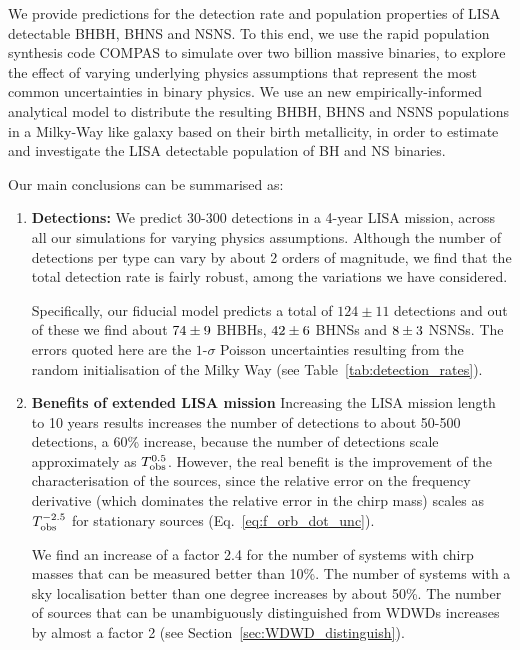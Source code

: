 We provide predictions for the detection rate and population properties of LISA detectable BHBH, BHNS and NSNS.
To this end, we use the rapid population synthesis code COMPAS to simulate over two billion massive binaries, to explore the effect of varying underlying physics assumptions that represent the most common uncertainties in binary physics. We use an new empirically-informed analytical model to distribute the resulting BHBH, BHNS and NSNS populations in a Milky-Way like galaxy based on their birth metallicity, in order to estimate and investigate the LISA detectable population of BH and NS binaries.

Our main conclusions can be summarised as:
\begin{enumerate}
    \item \textbf{Detections:} We predict 30-300 detections in a 4-year LISA mission, across all our simulations for varying physics assumptions. Although the number of detections per type can vary by about 2 orders of magnitude, we find that the total detection rate is fairly robust, among the variations we have considered.
    
    Specifically, our fiducial model predicts a total of $124 \pm 11$ detections and out of these we find about $74{}\pm 9$ BHBHs, $42{}\pm 6$ BHNSs and $8{}\pm 3$ NSNSs. The errors quoted here are the $1$-$\sigma$ Poisson uncertainties resulting from the random initialisation of the Milky Way (see Table~\ref{tab:detection_rates}).
    
    \item \textbf{Benefits of extended LISA mission} Increasing the LISA mission length to 10 years results increases the number of detections to about 50-500 detections, a 60\% increase, because the number of detections scale approximately as $T_{\rm obs}^{0.5}$.
%    
    However, the real benefit is the improvement of the characterisation of the sources, since the relative error on the frequency derivative (which dominates the relative error in the chirp mass) scales as $T_{\rm obs}^{-2.5}$  for stationary sources (Eq.~\ref{eq:f_orb_dot_unc}).
    
    We find an increase of a factor 2.4 for the number of systems with chirp masses that can be measured better than 10\%. 
%    
    The number of systems with a sky localisation better than one degree increases by about 50\%.
%    
    The number of sources that can be unambiguously distinguished from WDWDs increases by almost a factor 2 (see Section~\ref{sec:WDWD_distinguish}).
    

\end{enumerate}
